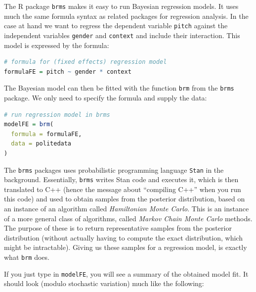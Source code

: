 \documentclass[nobib]{tufte-handout}
\begin{document}
The R package \texttt{brms} \citep{buerkner2016brms} makes it easy to run Bayesian regression models. It uses much the same formula syntax as related packages for regression analysis. In the case at hand we want to regress the dependent variable \texttt{pitch} against the independent variables \texttt{gender} and \texttt{context} and include their interaction. This model is expressed by the formula:

\begin{minipage}[]{\textwidth}
\begin{lstlisting}[language=R]
# formula for (fixed effects) regression model
formulaFE = pitch ~ gender * context
\end{lstlisting}
\end{minipage}

The Bayesian model can then be fitted with the function \texttt{brm} from the \texttt{brms} package. We only need to specify the formula and supply the data:

\begin{minipage}[]{\textwidth}
\begin{lstlisting}[language=R]
# run regression model in brms
modelFE = brm(
  formula = formulaFE,
  data = politedata
)
\end{lstlisting}
\end{minipage}

\noindent The \texttt{brms} packages uses probabilistic programming language \texttt{Stan} in the background. Essentially, \texttt{brms} writes Stan code and executes it, which is then translated to C++ (hence the message about ``compiling C++'' when you run this code) and used to obtain samples from the posterior distribution, based on an instance of an algorithm called \emph{Hamiltonian Monte Carlo}. This is an instance of a more general class of algorithms, called \emph{Markov Chain Monte Carlo} methods. The purpose of these is to return representative samples from the posterior distribution (without actually having to compute the exact distribution, which might be intractable). Giving us these samples for a regression model, is exactly what \texttt{brm} does.


If you just type in \texttt{modelFE}, you will see a summary of the obtained model fit. It should look (modulo stochastic variation) much like the following:

\medskip
\end{document}
